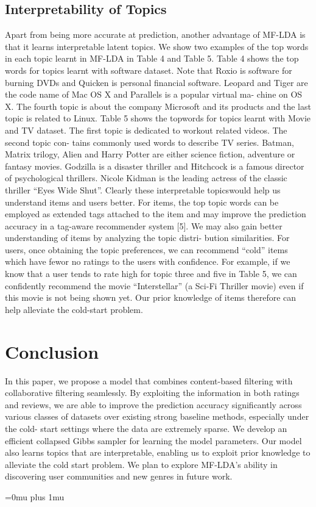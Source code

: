\documentclass[10pt,conference]{IEEEtran}
\begin{document}
\subsection{Interpretability of Topics}
Apart from being more accurate at pred​iction, another advantage of MF-LDA is that it learns interpretable latent topics. We show two examples of the top words in each topic learnt in MF-LDA in Table 4 and Table 5. Table 4 shows the top words for topics learnt with software dataset. Note that Roxio is software for burning DVDs and Quicken is personal financial software. Leopard and Tiger are the code name of Mac OS X and Parallels is a popular virtual ma- chine on OS X. The fourth topic is about the company Microsoft and its products and the last topic is related to Linux. Table 5 shows the topwords for topics learnt with Movie and TV dataset. The first topic is dedicated to workout related videos. The second topic con- tains commonly used words to describe TV series. Batman, Matrix trilogy, Alien and Harry Potter are either science fiction, adventure or fantasy movies. Godzilla is a disaster thriller and Hitchcock is a famous director of psychological thrillers. Nicole Kidman is the leading actress of the classic thriller “Eyes Wide Shut”. Clearly these interpretable topicswould help us understand items and users better. For items, the top topic words can be employed as extended tags attached to the item and may improve the prediction accuracy in a tag-aware recommender system [5]. We may also gain better understanding of items by analyzing the topic distri- bution similarities. For users, once obtaining the topic preferences, we can recommend “cold” items which have fewor no ratings to the users with confidence. For example, if we know that a user tends to rate high for topic three and five in Table 5, we can confidently recommend the movie “Interstellar” (a Sci-Fi Thriller movie) even if this movie is not being shown yet. Our prior knowledge of items therefore can help alleviate the cold-start problem.


\section{Conclusion}
In this paper, we propose a model that combines content-based filtering with collaborative filtering seamlessly. By exploiting the information in both ratings and reviews, we are able to improve the prediction accuracy significantly across various classes of datasets over existing strong baseline methods, especially under the cold- start settings where the data are extremely sparse. We develop an efficient collapsed Gibbs sampler for learning the model parameters. Our model also learns topics that are interpretable, enabling us to exploit prior knowledge to alleviate the cold start problem. We plan to explore MF-LDA’s ability in discovering user communities and new genres in future work.



\nocite{Chen2015}
\nocite{Qiu2016}
\nocite{He2016}
\nocite{Mcauley2013}
\nocite{Pang2006}
\nocite{Cheng2018}
\nocite{Ling2014}
\nocite{Ganu2009}
\nocite{Heng2018}

\newpage
\Urlmuskip=0mu plus 1mu\relax



\end{document}
